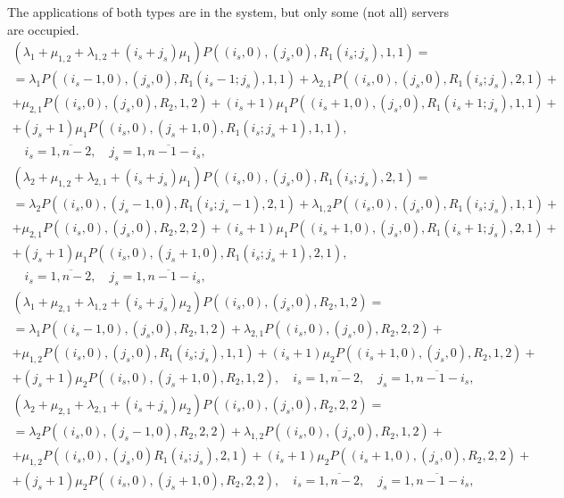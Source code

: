 {The applications of both types are in the system, but only some (not
all) servers are occupied.
\begin{multline}
  \left(\lambda_1+\mu_{1,2}+\lambda_{1,2}+(i_s+j_s)\mu_1\right)
  P\left((i_s,0),(j_s,0),R_1(i_s;j_s),1,1\right)=\\ =
  \lambda_1
  P\left((i_s-1,0),(j_s,0),R_1(i_s-1;j_s),1,1\right)+\lambda_{2,1}
  P\left((i_s,0),(j_s,0),R_1(i_s;j_s),2,1\right)+\\ +
  \mu_{2,1} P\left((i_s,0),(j_s,0),R_2,1,2\right)+(i_s+1)\mu_1
  P\left((i_s+1,0),(j_s,0),R_1(i_s+1;j_s),1,1\right)+\\ +
  (j_s+1)\mu_1 P\left((i_s,0),(j_s+1,0),R_1(i_s;j_s+1),1,1\right), \\
  \quad i_s=\overline{1,n-2}, \quad j_s=\overline{1,n-1-i_s},
\label{eq:8.1}
\end{multline}
\begin{multline}
  \left(\lambda_2+\mu_{1,2}+\lambda_{2,1}+(i_s+j_s)\mu_1\right)
  P\left((i_s,0),(j_s,0),R_1(i_s;j_s),2,1\right)=\\ =
  \lambda_2
  P\left((i_s,0),(j_s-1,0),R_1(i_s;j_s-1),2,1\right)+\lambda_{1,2}
  P\left((i_s,0),(j_s,0),R_1(i_s;j_s),1,1\right)+\\ +
  \mu_{2,1} P\left((i_s,0),(j_s,0),R_2,2,2\right)+(i_s+1)\mu_1
  P\left((i_s+1,0),(j_s,0),R_1(i_s+1;j_s),2,1\right)+\\ +
  (j_s+1)\mu_1 P\left((i_s,0),(j_s+1,0),R_1(i_s;j_s+1),2,1\right), \\
  \quad i_s=\overline{1,n-2}, \quad j_s=\overline{1,n-1-i_s},
\label{eq:8.2}
\end{multline}
\begin{multline}
  \left(\lambda_1+\mu_{2,1}+\lambda_{1,2}+(i_s+j_s)\mu_2\right)
  P\left((i_s,0),(j_s,0),R_2,1,2\right)=\\ = \lambda_1
  P\left((i_s-1,0),(j_s,0),R_2,1,2\right)+\lambda_{2,1}
  P\left((i_s,0),(j_s,0),R_2,2,2\right)+\\ + \mu_{1,2}
  P\left((i_s,0),(j_s,0),R_1(i_s;j_s),1,1\right)+(i_s+1)\mu_2
  P\left((i_s+1,0),(j_s,0),R_2,1,2\right)+\\ + (j_s+1)\mu_2
  P\left((i_s,0),(j_s+1,0),R_2,1,2\right), \quad i_s=\overline{1,n-2},
  \quad j_s=\overline{1,n-1-i_s},
\label{eq:8.3}
\end{multline}
\begin{multline}
  \left(\lambda_2+\mu_{2,1}+\lambda_{2,1}+(i_s+j_s)\mu_2\right)
  P\left((i_s,0),(j_s,0),R_2,2,2\right)=\\ =
  \lambda_2 P\left((i_s,0),(j_s-1,0),R_2,2,2\right)+\lambda_{1,2}
  P\left((i_s,0),(j_s,0),R_2,1,2\right)+\\ +
  \mu_{1,2} P\left((i_s,0),(j_s,0)R_1(i_s;j_s),2,1\right)+(i_s+1)\mu_2
  P\left((i_s+1,0),(j_s,0),R_2,2,2\right)+\\ +
  (j_s+1)\mu_2 P\left((i_s,0),(j_s+1,0),R_2,2,2\right), \quad
  i_s=\overline{1,n-2}, \quad j_s=\overline{1,n-1-i_s},
\label{eq:8.4}
\end{multline}

}
